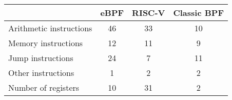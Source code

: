 \begin{tabular}{lccc}
\toprule
 & eBPF & RISC-V & Classic BPF \\
\midrule
 Arithmetic instructions & 46 & 33 & 10 \\
 Memory instructions & 12 & 11 & 9 \\
 Jump instructions & 24 & 7 & 11 \\
 Other instructions & 1 & 2 & 2 \\
 Number of registers & 10 & 31 & 2 \\

\bottomrule

\end{tabular}